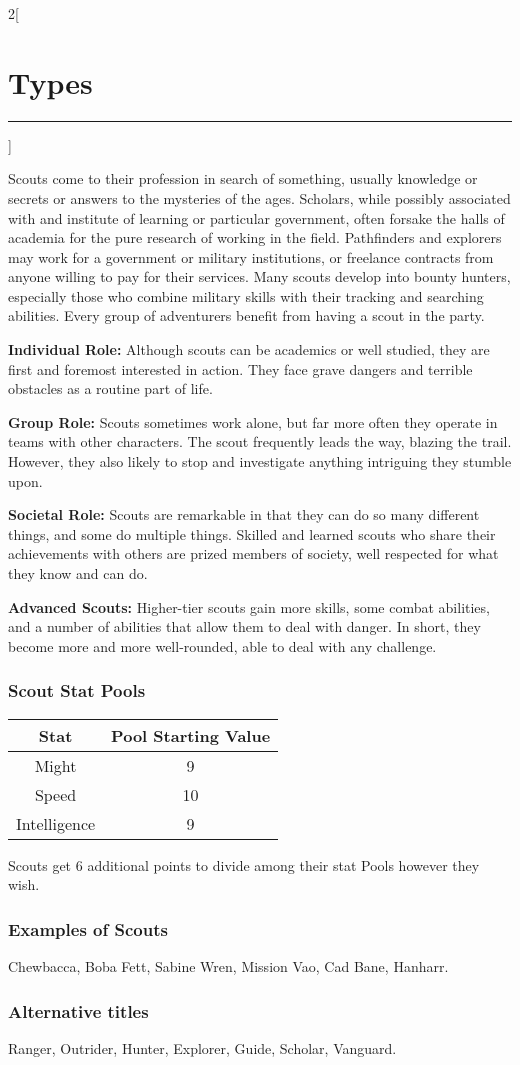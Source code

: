\documentclass[a4paper,10pt,final]{book}
\newcommand{\HRule}{\rule{\linewidth}{0.5mm}} %
\newcommand{\newSection}[1]{\section*{#1} \addcontentsline{toc}{section}{#1} \label{sec:#1} \HRule}
\newcommand{\statPool}[5]
{
	\subsubsection*{#1 Stat Pools}
	\label{subsub:#1StatPools}
	\begin{center}
	\begin{tabular}{ |c|c| }
	\hline
	\textbf{Stat} & \textbf{Pool Starting Value} \\
	\hline \hline
	Might & #2 \\
	\hline
 	Speed & #3  \\
 	\hline
 	Intelligence & #4  \\
 	\hline
	\end{tabular}
	\end{center}
	#1s get #5 additional points to divide among their stat Pools however they wish.
}
\newcommand{\itemLine}[2]{\textbf{#1:} {#2}\par}
\newenvironment{docsection}[1]
{
  \begin{multicols*}{2}[\newSection{#1}]
}
{
  \end{multicols*}
  \newpage
}
\begin{document}
\begin{docsection}{Types}
Scouts come to their profession in search of something, usually knowledge or secrets or answers to the mysteries of the ages. Scholars, while possibly associated with and institute of learning or particular government, often forsake the halls of academia for the pure research of working in the field. Pathfinders and explorers may work for a government or military institutions, or freelance contracts from anyone willing to pay for their services. Many scouts develop into bounty hunters, especially those who combine military skills with their tracking and searching abilities. Every group of adventurers benefit from having a scout in the party.

\itemLine{Individual Role} {Although scouts can be academics or well studied, they are first and foremost interested in action. They face grave dangers and terrible obstacles as a routine part of life.}

\itemLine{Group Role} {Scouts sometimes work alone, but far more often they operate in teams with other characters. The scout frequently leads the way, blazing the trail. However, they also likely to stop and investigate anything intriguing they stumble upon.}

\itemLine{Societal Role} {Scouts are remarkable in that they can do so many different things, and some do multiple things. Skilled and learned scouts who share their achievements with others are prized members of society, well respected for what they know and can do.}

\itemLine{Advanced Scouts} {Higher-tier scouts gain more skills, some combat abilities, and a number of abilities that allow them to deal with danger. In short, they become more and more well-rounded, able to deal with any challenge.}

\statPool{Scout}{9}{10}{9}{6}

\subsubsection*{Examples of Scouts}
\label{subsub:scoutExamples}

Chewbacca, Boba Fett, Sabine Wren, Mission Vao, Cad Bane, Hanharr.

\subsubsection*{Alternative titles}
\label{subsub:scoutAlternative}

Ranger, Outrider, Hunter, Explorer, Guide, Scholar, Vanguard.


\end{docsection}
\end{document}
